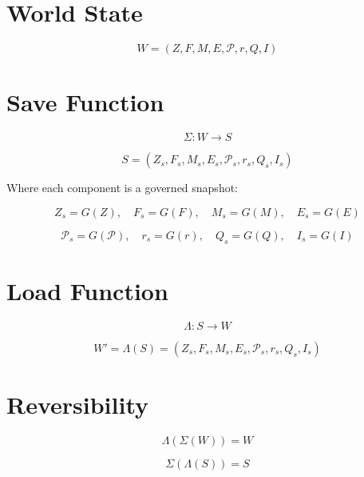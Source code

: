 
\section*{World State}

\[
W = (Z, F, M, E, \mathcal{P}, r, Q, I)
\]


\section*{Save Function}

\[
\Sigma : W \to S
\]

\[
S = (Z_s, F_s, M_s, E_s, \mathcal{P}_s, r_s, Q_s, I_s)
\]

Where each component is a governed snapshot:

\[
Z_s = G(Z),\quad
F_s = G(F),\quad
M_s = G(M),\quad
E_s = G(E)
\]

\[
\mathcal{P}_s = G(\mathcal{P}),\quad
r_s = G(r),\quad
Q_s = G(Q),\quad
I_s = G(I)
\]


\section*{Load Function}

\[
\Lambda : S \to W
\]

\[
W' = \Lambda(S)
= (Z_s, F_s, M_s, E_s, \mathcal{P}_s, r_s, Q_s, I_s)
\]


\section*{Reversibility}

\[
\Lambda(\Sigma(W)) = W
\]

\[
\Sigma(\Lambda(S)) = S
\]


